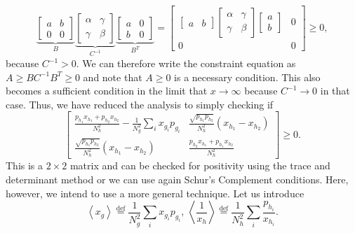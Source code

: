 \documentclass{theoretics}
\begin{document}
\begin{displaymath}
\underbrace{\left[\begin{array}{cc}
	a & b\\
	0 & 0
	\end{array}\right]}_{B}\underbrace{\left[\begin{array}{cc}
	\alpha & \gamma\\
	\gamma & \beta
	\end{array}\right]}_{C^{-1}}\underbrace{\left[\begin{array}{cc}
	a & 0\\
	b & 0
	\end{array}\right]}_{B^{T}}=\left[\begin{array}{cc}
\left[\begin{array}{cc}
a & b\end{array}\right]\left[\begin{array}{cc}
\alpha & \gamma\\
\gamma & \beta
\end{array}\right]\left[\begin{array}{c}
a\\
b
\end{array}\right] & 0\\
0 & 0
\end{array}\right]\ge0,
\end{displaymath}
because $C^{-1}>0$. We can therefore write the constraint equation
as
$
A\ge BC^{-1}B^{T}\ge0
$
and note that $A\ge0$ is a necessary condition. This also becomes
a sufficient condition in the limit that $x\to\infty$ because $C^{-1}\to0$
in that case. Thus, we have reduced the analysis to simply checking
if 
\begin{displaymath}
\left[\begin{array}{cc}
\frac{p_{h_{1}}x_{h_{1}}+p_{h_{2}}x_{h_{2}}}{N_{h}^{2}}-\frac{1}{N_{g}^{2}}\sum_{i}x_{g_{i}}p_{g_{i}} & \frac{\sqrt{p_{h_{1}}p_{h_{2}}}}{N_{h}^{2}}(x_{h_{1}}-x_{h_{2}})\\
\frac{\sqrt{p_{h_{1}}p_{h_{2}}}}{N_{h}^{2}}(x_{h_{1}}-x_{h_{2}}) & \frac{p_{h_{2}}x_{h_{1}}+p_{h_{1}}x_{h_{2}}}{N_{h}^{2}}
\end{array}\right]\ge0.
\end{displaymath}
This is a $2\times2$ matrix and can be checked for positivity using the
trace and determinant method or we can use again Schur's
Complement conditions. Here, however, we intend to use a more
general technique.
Let us introduce 
\begin{displaymath}
\left\langle x_{g}\right\rangle \overset{\text{def}}{=}\frac{1}{N_{g}^{2}}\sum_{i}x_{g_{i}}p_{g_{i}},\,\left\langle \frac{1}{x_{h}}\right\rangle \overset{\text{def}}{=}\frac{1}{N_{h}^{2}}\sum_{i}\frac{p_{h_{i}}}{x_{h_{i}}}.
\end{displaymath}
\end{document}
